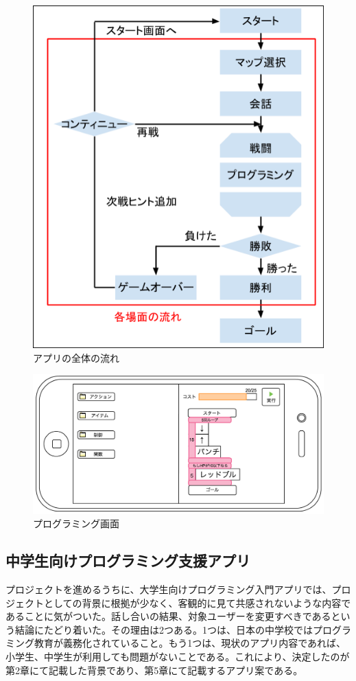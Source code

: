 \documentclass[openany,11pt,papersize]{jsbook}
\begin{document}
\begin{figure}[H]
\begin{center}
\includegraphics[width=12cm, bb=0 0 502 591]{img/LegendOfN_concept.png}
\end{center}
\caption{アプリの全体の流れ}
\end{figure}

\begin{figure}[H]
\begin{center}
\includegraphics[width=12cm, bb=0 0 1173 563]{img/LegendOfN_programming.png}
\end{center}
\caption{プログラミング画面}
\end{figure}
 
 \subsection{中学生向けプログラミング支援アプリ}
\par プロジェクトを進めるうちに、大学生向けプログラミング入門アプリでは、プロジェクトとしての背景に根拠が少なく、客観的に見て共感されないような内容であることに気がついた。話し合いの結果、対象ユーザーを変更すべきであるという結論にたどり着いた。その理由は2つある。1つは、日本の中学校ではプログラミング教育が義務化されていること。もう1つは、現状のアプリ内容であれば、小学生、中学生が利用しても問題がないことである。これにより、決定したのが第2章にて記載した背景であり、第5章にて記載するアプリ案である。
\end{document}
